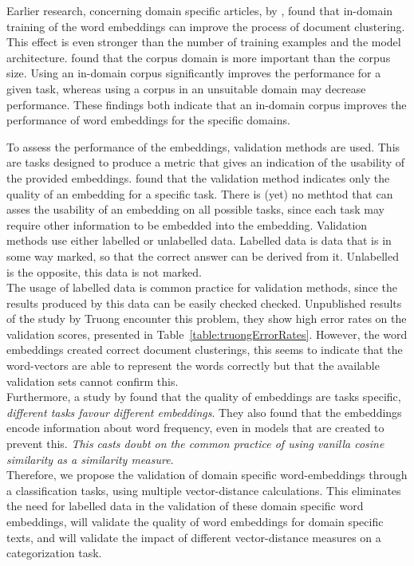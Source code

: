 \documentclass[../../Thesis.tex]{subfiles}
\begin{document}
Earlier research, concerning domain specific articles, by \citet{Truong2017Thesis}, found that in-domain training of the word embeddings can  improve the process of document clustering. This effect is even stronger than the number of training examples and the model architecture.
\citet{lai2016generate} found that the corpus domain is more important than the corpus size. Using an in-domain corpus significantly improves the performance for a given task, whereas using a corpus in an unsuitable domain may decrease performance. These findings both indicate that an in-domain corpus improves the performance of word embeddings for the specific domains.

To assess the performance of the embeddings, validation methods are used. This are tasks designed to produce a metric that gives an indication of the usability of the provided embeddings. \citet{schnabel2015evaluation} found that the validation method indicates only the quality of an embedding for a specific task. There is (yet) no methtod that can asses the usability of an embedding on all possible tasks, since each task may require other information to be embedded into the embedding.
Validation methods use either labelled or unlabelled data. Labelled data is data that is in some way marked, so that the correct answer can be derived from it. Unlabelled is the opposite, this data is not marked.\\
The usage of labelled data is common practice for validation methods, since the results produced by this data can be easily checked checked.
Unpublished results of the study by Truong encounter this problem, they show high error rates on the validation scores, presented in Table~\ref{table:truongErrorRates}. However, the word embeddings created correct document clusterings\cite{Truong2017Thesis}, this seems to indicate that the word-vectors are able to represent the words correctly but that the available validation sets cannot confirm this.\\
Furthermore, a study by \citet{schnabel2015evaluation} found that the quality of embeddings are tasks specific, \textit{different tasks favour different embeddings}. They also found that the embeddings encode information about word frequency, even in models that are created to prevent this. \textit{This casts doubt on the common practice of using vanilla cosine similarity as a similarity measure}.\\
Therefore, we propose the validation of domain specific word-embeddings through a classification tasks, using multiple vector-distance calculations. This eliminates the need for labelled data in the validation of these domain specific word embeddings, will validate the quality of word embeddings for domain specific texts, and will validate the impact of different vector-distance measures on a categorization task.\\
\end{document}
